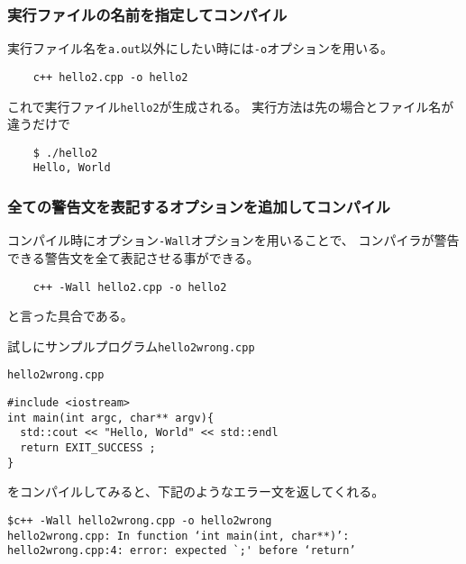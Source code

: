   
   \subsubsection*{実行ファイルの名前を指定してコンパイル}
   実行ファイル名を\texttt{a.out}以外にしたい時には\verb|-o|オプションを用いる。
   \begin{verbatim}
	c++ hello2.cpp -o hello2
   \end{verbatim}
   これで実行ファイル\texttt{hello2}が生成される。
   実行方法は先の場合とファイル名が違うだけで
   \begin{verbatim}
	$ ./hello2
	Hello, World
   \end{verbatim}
   
   
   
   \subsubsection*{全ての警告文を表記するオプションを追加してコンパイル}
   コンパイル時にオプション\verb|-Wall|オプションを用いることで、
   コンパイラが警告できる警告文を全て表記させる事ができる。
   \begin{verbatim}
	c++ -Wall hello2.cpp -o hello2
   \end{verbatim}
   と言った具合である。
   
   試しにサンプルプログラム\texttt{hello2wrong.cpp}
  \begin{itembox}{\texttt{hello2wrong.cpp}}
\begin{verbatim}
#include <iostream>
int main(int argc, char** argv){
  std::cout << "Hello, World" << std::endl
  return EXIT_SUCCESS ;
}
\end{verbatim}
  \end{itembox}
  をコンパイルしてみると、下記のようなエラー文を返してくれる。
\begin{verbatim}
$c++ -Wall hello2wrong.cpp -o hello2wrong
hello2wrong.cpp: In function ‘int main(int, char**)’:
hello2wrong.cpp:4: error: expected `;' before ‘return’	
\end{verbatim}
